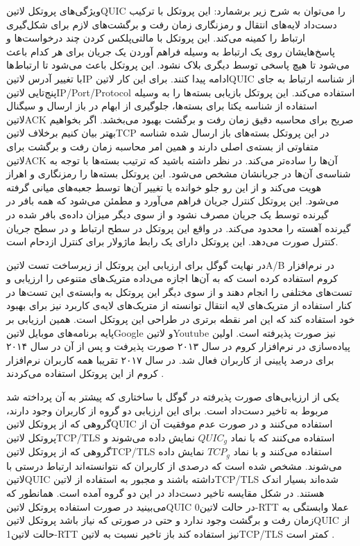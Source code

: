 ویژگی‌های پروتکل ‌لاتین{QUIC} را می‌توان به شرح زیر برشمارد:
 این پروتکل با ترکیب دست‌داد لایه‌های انتقال و رمزنگاری زمان رفت و برگشت‌های لازم برای شکل‌گیری ارتباط را کمینه می‌کند.
 این پروتکل با مالتی‌پلکس کردن چند درخواست‌ها و پاسخ‌هایشان روی یک ارتباط به وسیله فراهم آوردن یک جریان برای هر کدام باعث می‌شود تا هیچ پاسخی توسط دیگری بلاک نشود.
 این پروتکل باعث می‌شود تا ارتباط‌ها با تغییر آدرس ‌لاتین{IP} ادامه پیدا کنند. برای این کار ‌لاتین{QUIC} از شناسه ارتباط به جای پنج‌تایی ‌لاتین{IP/Port/Protocol} استفاده می‌کند.
 این پروتکل بازیابی بسته‌ها را به وسیله استفاده از شناسه یکتا برای بسته‌ها، جلوگیری از ابهام در باز ارسال و سیگنال ‌لاتین{ACK} صریح برای محاسبه دقیق زمان رفت و برگشت بهبود می‌بخشد. اگر بخواهیم بهتر بیان کنیم برخلاف ‌لاتین{TCP} در این پروتکل
بسته‌های باز ارسال شده شناسه متفاوتی از بسته‌ی اصلی دارند و همین امر محاسبه زمان رفت و برگشت برای ‌لاتین{ACK} آن‌ها را ساده‌تر می‌کند. در نظر داشته باشید که ترتیب بسته‌ها با توجه به شناسه‌ی آن‌ها در جریانشان مشخص می‌شود.
 این پروتکل بسته‌ها را رمزنگاری و اهراز هویت می‌کند و از این رو جلو خوانده یا تغییر آن‌ها توسط جعبه‌های میانی گرفته می‌شود.
 این پروتکل کنترل جریان فراهم می‌آورد و مطمئن می‌شود که همه بافر در گیرنده توسط یک جریان مصرف نشود و از سوی دیگر میزان داده‌ی بافر شده در گیرنده آهسته را محدود می‌کند. در واقع این پروتکل در سطح ارتباط و در سطح جریان کنترل صورت می‌دهد.
 این پروتکل دارای یک رابط ماژولار برای کنترل ازدحام است.

در نهایت گوگل برای ارزیابی این پروتکل از زیرساخت تست ‌لاتین{A/B} در نرم‌افزار کروم استفاده کرده است که به آن‌ها اجازه می‌داده متریک‌های متنوعی را ارزیابی و تست‌های مختلفی را انجام دهند
و از سوی دیگر این پروتکل به وابسته‌ی این تست‌ها در کنار استفاده از متریک‌های لایه انتقال توانسته از متریک‌های لایه‌ی کاربرد نیز برای بهبود خود استفاده کند که این امر نقطه برتری در طراحی این پروتکل است.
همین ارزیابی بر پایه برنامه‌های موبایل ‌لاتین{Google} و ‌لاتین{Youtube} نیز صورت پذیرفته است.
اولین پیاده‌سازی در نرم‌افزار کروم در سال ۲۰۱۳ صورت پذیرفت و پس از آن در سال ۲۰۱۴ برای درصد پایینی از کاربران فعال شد. در سال ۲۰۱۷ تقریبا همه کاربران نرم‌افزار کروم از این پروتکل استفاده می‌کردند
.

یکی از ارزیابی‌های صورت پذیرفته در گوگل با ساختاری که پیشتر به آن پرداخته شد مربوط به تاخیر دست‌داد است. برای این ارزیابی دو گروه از کاربران وجود دارند، گروهی که از پروتکل ‌لاتین{QUIC} استفاده می‌کنند
و در صورت عدم موفقیت آن از پروتکل ‌لاتین{TCP/TLS} استفاده می‌کنند که با نماد $QUIC_{g}$ نمایش داده می‌شوند و گروهی که از پروتکل ‌لاتین{TCP/TLS} استفاده می‌کنند و با نماد $TCP_{g}$
نمایش داده می‌شوند. مشخص شده است که درصدی از کاربران که نتوانسته‌اند ارتباط درستی با ‌لاتین{QUIC} داشته باشند و مجبور به استفاده از ‌لاتین{TCP/TLS} شده‌اند بسیار اندک هستند.
در شکل  مقایسه تاخیر دست‌داد در این دو گروه آمده است. همانطور که می‌بینید در صورت استفاده پروتکل ‌لاتین{QUIC} در حالت ‌لاتین{0-RTT}
عملا وابستگی به زمان رفت و برگشت وجود ندارد و حتی در صورتی که نیاز باشد پروتکل ‌لاتین{QUIC} از حالت ‌لاتین{1-RTT} نیز استفاده کند باز تاخیر نسبت به ‌لاتین{TCP/TLS} کمتر است
.

